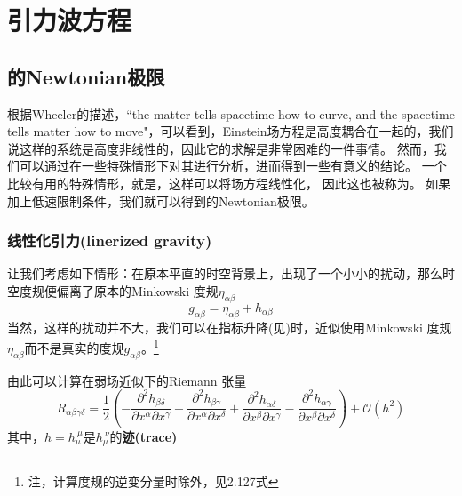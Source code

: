 
\chapter{引力波方程}
\label{chap2}

\section{\GR 的Newtonian极限}
根据Wheeler的描述，``the matter tells spacetime how to curve, and the spacetime tells matter how to move"，可以看到，Einstein场方程是高度耦合在一起的，我们说这样的系统是高度非线性的，因此它的求解是非常困难的一件事情。
然而，我们可以通过在一些特殊情形下对其进行分析，进而得到一些有意义的结论。
一个比较有用的特殊情形，就是{}，这样可以将场方程线性化， 因此这也被称为{}。
如果加上低速限制条件，我们就可以得到\GR 的Newtonian极限。

\subsection{线性化引力(linerized gravity)}\label{sec:LinGrav}
让我们考虑如下情形：在原本平直的时空背景上，出现了一个小小的扰动，那么时空度规便偏离了原本的Minkowski 度规$\eta_{\alpha\beta}$
\begin{equation}\label{eq:LinearMetric} 
  g_{\alpha\beta}=  \eta _{\alpha\beta} + h_{\alpha\beta}
\end{equation}
当然，这样的扰动并不大，我们可以在指标升降(见)时，近似使用Minkowski 度规$\eta _{\alpha\beta}$而不是真实的度规$g_{\alpha\beta}$。\footnote{注，计算度规的逆变分量时除外，见\cite{Creighton2011}2.127式}

由此可以计算在弱场近似下的Riemann 张量
\begin{equation}\label{eq:RiemannTensorLin}
  R_{\alpha\beta\gamma\delta}= \frac{1}{2}\left(- \frac{\partial^2 h_{\beta\delta}}{\partial x^\alpha \partial x^\gamma} + \frac{\partial^2 h_{\beta\gamma}}{\partial x^\alpha \partial x^\delta} + \frac{\partial^2 h_{\alpha\delta}}{\partial x^\beta \partial x^\gamma} - \frac{\partial^2 h_{\alpha\gamma}}{\partial x^\beta \partial x^\delta}  \right) + \mathcal{O}(h^2)
\end{equation}
其中，$h = h_\mu^{~\mu}$是$h_\mu^{~\nu}$的{\textbf{迹(trace)}}

